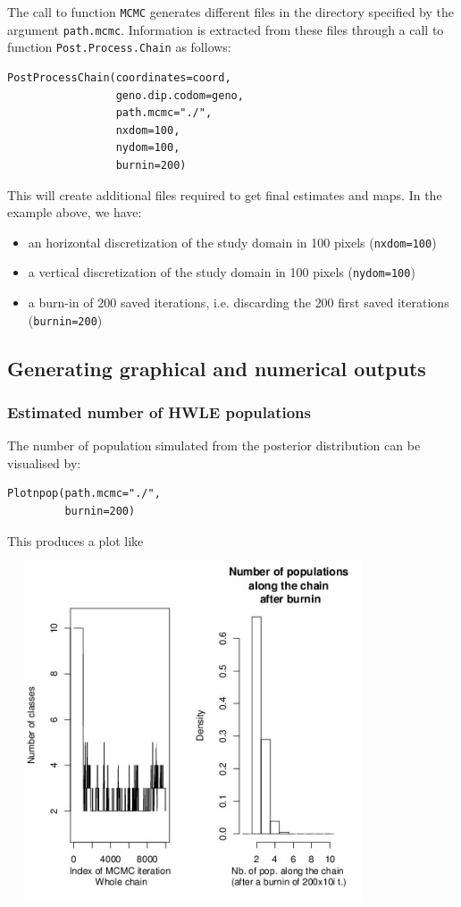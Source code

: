 \documentclass[a4paper,10pt]{article}
\begin{document}
The call to function \texttt{MCMC} generates different files in the directory specified by the argument \texttt{path.mcmc}. 
Information is extracted from these files through a call to function \texttt{Post.Process.Chain} 
as follows:

\begin{verbatim}
PostProcessChain(coordinates=coord,
                 geno.dip.codom=geno,
                 path.mcmc="./",
                 nxdom=100,
                 nydom=100,
                 burnin=200)
\end{verbatim}



This will create additional files required to get final estimates and maps. In the example above, we have: 
\begin{itemize}
\item an horizontal  discretization of the study domain in 100 pixels (\texttt{nxdom=100})
\item a vertical  discretization of the study domain in 100 pixels (\texttt{nydom=100})
\item a burn-in of $200$ saved  iterations, i.e. discarding the $200$ first saved iterations (\texttt{burnin=200})
\end{itemize}


\subsection{Generating graphical and numerical outputs}

\subsubsection{Estimated number  of HWLE populations}
The number of population simulated from the posterior distribution can be visualised by:

\begin{verbatim}
Plotnpop(path.mcmc="./",
         burnin=200)
\end{verbatim}




This produces a plot like

\centerline{\includegraphics[height=10cm,width=11cm]{fig/npop.jpeg}}
\end{document}
